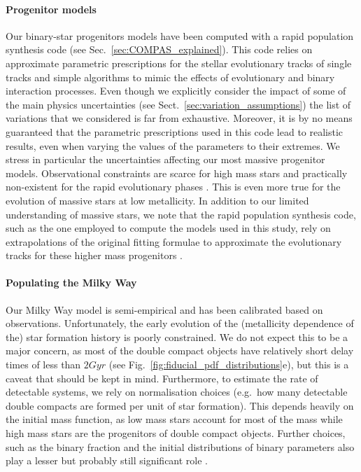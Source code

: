 \paragraph{Progenitor models} Our binary-star progenitors models have been computed with a rapid population synthesis code (see Sec.~\ref{sec:COMPAS_explained}). This code relies on approximate parametric prescriptions for the stellar evolutionary tracks of single tracks and simple algorithms to mimic the effects of evolutionary and binary interaction  processes. Even though we explicitly consider the impact of some of the main physics uncertainties (see Sect.~\ref{sec:variation_assumptions}) the list of variations that we considered is far from exhaustive. Moreover, it is by no means guaranteed that the parametric prescriptions used in this code lead to realistic results, even when varying the values of the parameters to their extremes. We stress in particular the uncertainties affecting our most massive progenitor models. Observational constraints are scarce for high mass stars and practically non-existent for the rapid evolutionary phases \citep[e.g.][]{Langer2012, Mapelli+2021}. This is even more true for the evolution of massive stars at low metallicity. In addition to our limited understanding of massive stars, we note that the rapid population synthesis code, such as the one employed to compute the models used in this study, rely on extrapolations of the original fitting formulae to approximate the evolutionary tracks for these higher mass progenitors \citep{Hurley+2000,Hurley+2002}. 
 
\paragraph{Populating the Milky Way} Our Milky Way model is semi-empirical and has been calibrated based on observations. Unfortunately, the early evolution of the (metallicity dependence of the) star formation history is poorly constrained. We do not expect this to be a major concern, as most of the double compact objects have relatively short delay times of less than $2 \unit{Gyr}$ (see Fig.~\ref{fig:fiducial_pdf_distributions}e), but this is a caveat that should be kept in mind. Furthermore, to estimate the rate of detectable systems, we rely on normalisation choices (e.g.\ how many detectable double compacts are formed per unit of star formation). This depends heavily on the initial mass function, as low mass stars account for most of the mass while high mass stars are the progenitors of double compact objects. Further choices, such as the binary fraction and the initial distributions of binary parameters also play a lesser but probably still significant role \citet[e.g.][]{deMink+2015, Chruslinska+2017, Klencki+2018}. 

